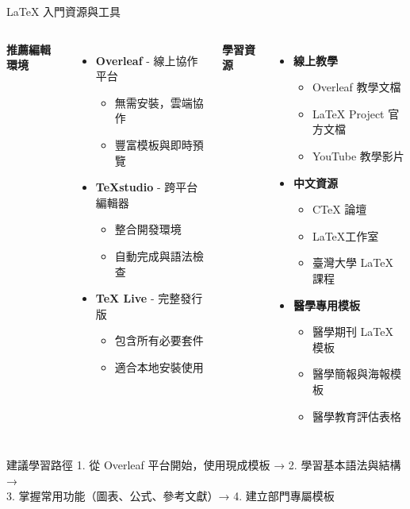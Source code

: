 \documentclass[aspectratio=169]{beamer}
\begin{document}
\begin{frame}{LaTeX 入門資源與工具}
  \begin{columns}
    \textbf{推薦編輯環境}
    \begin{itemize}
      \item \textbf{Overleaf} - 線上協作平台
        \begin{itemize}
          \item 無需安裝，雲端協作
          \item 豐富模板與即時預覽
        \end{itemize}
      \item \textbf{TeXstudio} - 跨平台編輯器
        \begin{itemize}
          \item 整合開發環境
          \item 自動完成與語法檢查
        \end{itemize}
      \item \textbf{TeX Live} - 完整發行版
        \begin{itemize}
          \item 包含所有必要套件
          \item 適合本地安裝使用
        \end{itemize}
    \end{itemize}
    
    \textbf{學習資源}
    \begin{itemize}
      \item \textbf{線上教學}
        \begin{itemize}
          \item Overleaf 教學文檔
          \item LaTeX Project 官方文檔
          \item YouTube 教學影片
        \end{itemize}
      \item \textbf{中文資源}
        \begin{itemize}
          \item CTeX 論壇
          \item LaTeX工作室
          \item 臺灣大學 LaTeX 課程
        \end{itemize}
      \item \textbf{醫學專用模板}
        \begin{itemize}
          \item 醫學期刊 LaTeX 模板
          \item 醫學簡報與海報模板
          \item 醫學教育評估表格
        \end{itemize}
    \end{itemize}
  \end{columns}
  
  \begin{block}{建議學習路徑}
    1. 從 Overleaf 平台開始，使用現成模板 → 2. 學習基本語法與結構 → \\
    3. 掌握常用功能（圖表、公式、參考文獻）→ 4. 建立部門專屬模板
  \end{block}
\end{frame}
\end{document}
